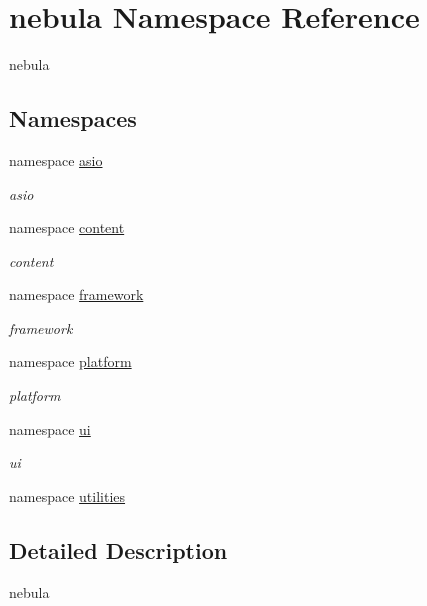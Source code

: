 \hypertarget{namespacenebula}{
\section{nebula Namespace Reference}
\label{namespacenebula}
}


nebula  
\subsection*{Namespaces}
\begin{DoxyCompactItemize}
\item 
namespace \hyperlink{namespacenebula_1_1asio}{asio}


\begin{DoxyCompactList}\small\item\em asio \item\end{DoxyCompactList}\item 
namespace \hyperlink{namespacenebula_1_1content}{content}


\begin{DoxyCompactList}\small\item\em content \item\end{DoxyCompactList}\item 
namespace \hyperlink{namespacenebula_1_1framework}{framework}


\begin{DoxyCompactList}\small\item\em framework \item\end{DoxyCompactList}\item 
namespace \hyperlink{namespacenebula_1_1platform}{platform}


\begin{DoxyCompactList}\small\item\em platform \item\end{DoxyCompactList}\item 
namespace \hyperlink{namespacenebula_1_1ui}{ui}


\begin{DoxyCompactList}\small\item\em ui \item\end{DoxyCompactList}\item 
namespace \hyperlink{namespacenebula_1_1utilities}{utilities}
\end{DoxyCompactItemize}


\subsection{Detailed Description}
nebula 